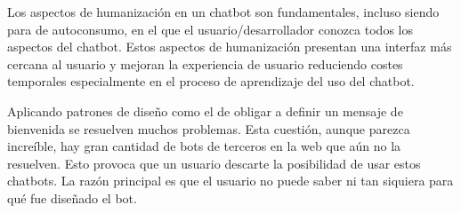 Los aspectos de humanización en un chatbot son fundamentales, incluso siendo para de autoconsumo, en el que el usuario/desarrollador conozca todos los aspectos del chatbot. Estos aspectos de humanización presentan una interfaz más cercana al usuario y mejoran la experiencia de usuario reduciendo costes temporales especialmente en el proceso de aprendizaje del uso del chatbot.

Aplicando patrones de diseño como el de obligar a definir un mensaje de bienvenida se resuelven muchos problemas. Esta cuestión, aunque parezca increíble, hay gran cantidad de bots de terceros en la web que aún no la resuelven. Esto provoca que un usuario descarte la posibilidad de usar estos chatbots. La razón principal es que el usuario no puede saber ni tan siquiera para qué fue diseñado el bot.
























